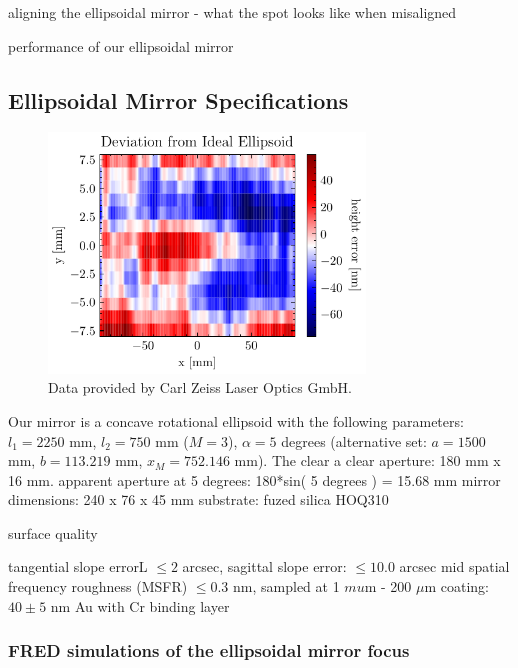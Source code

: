 aligning the ellipsoidal mirror - what the spot looks like when misaligned

performance of our ellipsoidal mirror

\subsection{Ellipsoidal Mirror Specifications}

\begin{figure}
	\centering
	\includegraphics[width=0.75\textwidth]{figures/chap2/EM_error.pdf}
	\caption{Data provided by Carl Zeiss Laser Optics GmbH.}
	\label{fig:EM_error}
\end{figure}

Our mirror is a concave rotational ellipsoid with the following parameters: $l_1 = 2250$ mm, $l_2 = 750$ mm ($M=3$), $\alpha = 5$ degrees (alternative set: $a = 1500$ mm, $b = 113.219$ mm, $x_M = 752.146$ mm). The clear a
clear aperture: 180 mm x 16 mm. apparent aperture at 5 degrees: 180*sin( 5 degrees ) = 15.68 mm
mirror dimensions: 240 x 76 x 45 mm
substrate: fuzed silica HOQ310

surface quality

tangential slope errorL $\le 2$ arcsec, sagittal slope error: $\le 10.0$ arcsec
mid spatial frequency roughness (MSFR) $\le 0.3$ nm, sampled at 1 $mu$m - 200 $\mu$m
coating: $40 \pm 5$ nm Au with Cr binding layer



\subsubsection{FRED simulations of the ellipsoidal mirror focus}

